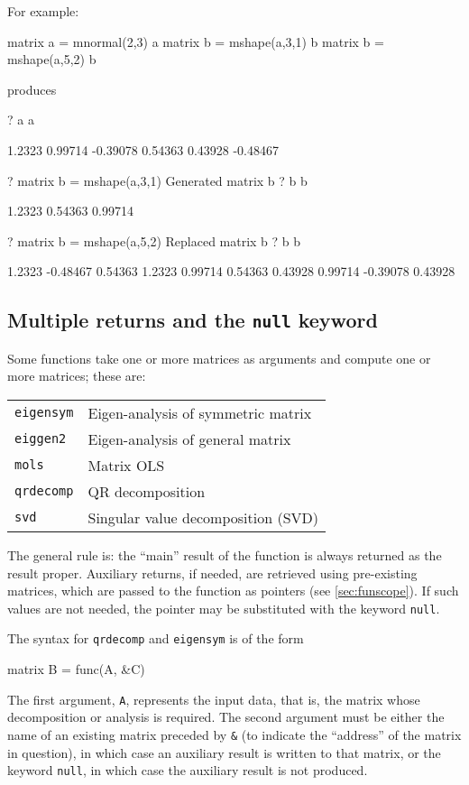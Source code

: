 For example:
\begin{code}
matrix a = mnormal(2,3)
a
matrix b = mshape(a,3,1)
b
matrix b = mshape(a,5,2)
b
\end{code}
produces
\begin{code}
?   a
a

      1.2323      0.99714     -0.39078
     0.54363      0.43928     -0.48467

?   matrix b = mshape(a,3,1)
Generated matrix b
?   b
b

      1.2323
     0.54363
     0.99714

?   matrix b = mshape(a,5,2)
Replaced matrix b
?   b
b

      1.2323     -0.48467
     0.54363       1.2323
     0.99714      0.54363
     0.43928      0.99714
    -0.39078      0.43928
\end{code}

\subsection{Multiple returns and the \texttt{null} keyword}
\label{matrix-multiples}

Some functions take one or more matrices as arguments and compute one
or more matrices; these are:

\begin{center}
\begin{tabular}{ll}
\texttt{eigensym} & Eigen-analysis of symmetric matrix \\
\texttt{eiggen2}  & Eigen-analysis of general matrix \\
\texttt{mols}     & Matrix OLS \\
\texttt{qrdecomp} & QR decomposition \\
\texttt{svd}      & Singular value decomposition (SVD) 
\end{tabular}
\end{center}

The general rule is: the ``main'' result of the function is always
returned as the result proper. Auxiliary returns, if needed, are
retrieved using pre-existing matrices, which are passed to the
function as pointers (see \ref{sec:funscope}). If such values are not
needed, the pointer may be substituted with the keyword \texttt{null}.

The syntax for \texttt{qrdecomp} and \texttt{eigensym} is of the form
%
\begin{code}
matrix B = func(A, &C)
\end{code}
%
The first argument, \texttt{A}, represents the input data, that is,
the matrix whose decomposition or analysis is required.  The second
argument must be either the name of an existing matrix preceded by
\verb+&+ (to indicate the ``address'' of the matrix in question), in
which case an auxiliary result is written to that matrix, or the
keyword \texttt{null}, in which case the auxiliary result is not
produced.

